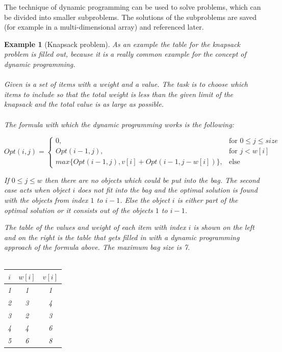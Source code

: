 \documentclass[a4paper, 11pt]{article}
\newtheorem*{example*}{Example}
\begin{document}
The technique of dynamic programming can be used to solve problems, which can be divided into smaller subproblems. The solutions of the subproblems are saved (for example in a multi-dimensional array) and referenced later. \cite{DP}
\\
\begin{example*}[Knapsack problem]

As an example the table for the knapsack problem is filled out, because it is a really common example for the concept of dynamic programming.
\\ \\
Given is a set of items with a weight and a value. The task is to choose which items to include so that the total weight is less than the given limit of the knapsack and the total value is as large as possible.
\\ \\
The formula with which the dynamic programming works is the following:


  $$
Opt(i,j)=
\begin{cases}
0, & \text{for } 0\leq j \leq size\\
        Opt(i-1, j), & \text{for } j < w[i]\\
        max\{ Opt(i-1, j), v[i]+Opt(i-1, j-w[i]) \}, & \text{else } 
\end{cases}
$$

If $0 \leq j \leq w$ then there are no objects which could be put into the bag. The second case acts when object $i$ does not fit into the bag and the optimal solution is found with the objects from index $1$ to $i-1$. Else the object $i$ is either part of the optimal solution or it consists out of the objects $1$ to $i-1$.


The table of the values and weight of each item with index $i$ is shown on the left and on the right is the table that gets filled in with a dynamic programming approach of the formula above. The maximum bag size is 7.
\\ \\
\begin{minipage}{0.3\textwidth}

\begin{tabular}{|c|c|c|}
\hline
$i$ & $w[i]$ & $v[i]$ \\
\hline
1 & 1 & 1 \\
2 & 3 & 4 \\
3 & 2 & 3 \\
4 & 4 & 6 \\
5 & 6 & 8 \\
\hline
\end{tabular}



\end{minipage}
\end{example*}
\end{document}
